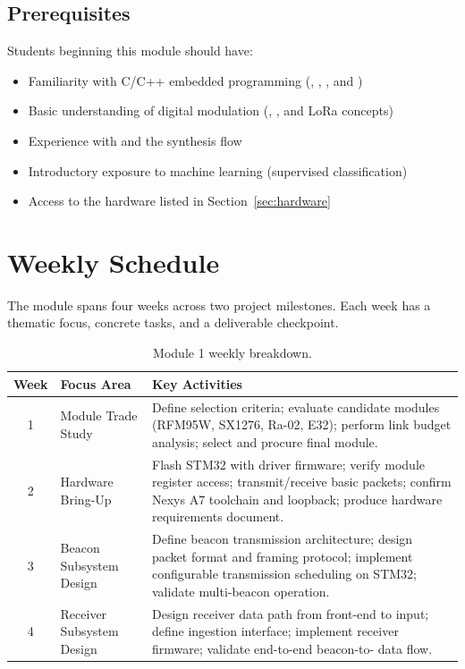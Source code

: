 \documentclass[11pt,letterpaper]{article}
\begin{document}
	\subsection{Prerequisites}
	
	Students beginning this module should have:
	\begin{itemize}[leftmargin=2em]
		\item Familiarity with C/C++ embedded programming (\GPIO{}, \SPI{}, \UART{}, and \IIC{})
		\item Basic understanding of digital modulation (\ASK{}, \FSK{}, and LoRa \CSS{} concepts)
		\item Experience with \VHDL{} and the \FPGA{} synthesis flow
		\item Introductory exposure to machine learning (supervised classification)
		\item Access to the hardware listed in Section~\ref{sec:hardware}
	\end{itemize}
	
	\newpage
	\section{Weekly Schedule}
	
	The module spans four weeks across two project milestones. Each week has a thematic focus, concrete tasks, and a deliverable checkpoint.
	
	\begin{table}[ht!]
		\centering
		\caption{Module 1 weekly breakdown.}
		\label{tab:schedule}
		\renewcommand{\arraystretch}{1.4}
		\begin{tabularx}{\textwidth}{c l X}
			\toprule
			\textbf{Week} & \textbf{Focus Area} & \textbf{Key Activities} \\
			\midrule
			1 & \RF{} Module Trade Study &
			Define selection criteria; evaluate candidate modules (RFM95W, SX1276, Ra-02, E32); perform link budget analysis; select and procure final module. \\
			2 & Hardware Bring-Up &
			Flash STM32 with \SPI{} driver firmware; verify \RF{} module register access; transmit/receive basic packets; confirm Nexys A7 toolchain and loopback; produce hardware requirements document. \\
			3 & Beacon Subsystem Design &
			Define beacon transmission architecture; design packet format and framing protocol; implement configurable transmission scheduling on STM32; validate multi-beacon operation. \\
			4 & Receiver Subsystem Design &
			Design receiver data path from \RF{} front-end to \FPGA{} input; define \FPGA{} ingestion interface; implement receiver firmware; validate end-to-end beacon-to-\FPGA{} data flow. \\
			\bottomrule
		\end{tabularx}
	\end{table}
	
\end{document}
